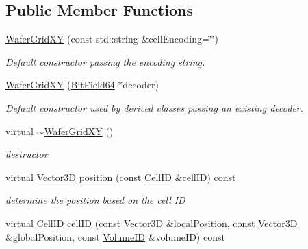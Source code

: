 \subsection*{Public Member Functions}
\begin{DoxyCompactItemize}
\item 
\hyperlink{class_d_d4hep_1_1_d_d_segmentation_1_1_wafer_grid_x_y_af8bf027d4db4e41a774451c0479e0e58}{WaferGridXY} (const std::string \&cellEncoding=\char`\"{}\char`\"{})
\begin{DoxyCompactList}\small\item\em Default constructor passing the encoding string. \item\end{DoxyCompactList}\item 
\hyperlink{class_d_d4hep_1_1_d_d_segmentation_1_1_wafer_grid_x_y_ad592caf7fc7f3b68248e3e81e653c773}{WaferGridXY} (\hyperlink{class_d_d4hep_1_1_d_d_segmentation_1_1_bit_field64}{BitField64} $\ast$decoder)
\begin{DoxyCompactList}\small\item\em Default constructor used by derived classes passing an existing decoder. \item\end{DoxyCompactList}\item 
virtual \hyperlink{class_d_d4hep_1_1_d_d_segmentation_1_1_wafer_grid_x_y_a07377755b469f13a9fea18473a39959e}{$\sim$WaferGridXY} ()
\begin{DoxyCompactList}\small\item\em destructor \item\end{DoxyCompactList}\item 
virtual \hyperlink{struct_d_d4hep_1_1_d_d_segmentation_1_1_vector3_d}{Vector3D} \hyperlink{class_d_d4hep_1_1_d_d_segmentation_1_1_wafer_grid_x_y_a1f72c4a0bc0cfbabe6395612518a4d34}{position} (const \hyperlink{namespace_d_d4hep_1_1_d_d_segmentation_ac7af071d85cb48820914434a07e21ba1}{CellID} \&cellID) const 
\begin{DoxyCompactList}\small\item\em determine the position based on the cell ID \item\end{DoxyCompactList}\item 
virtual \hyperlink{namespace_d_d4hep_1_1_d_d_segmentation_ac7af071d85cb48820914434a07e21ba1}{CellID} \hyperlink{class_d_d4hep_1_1_d_d_segmentation_1_1_wafer_grid_x_y_a9212a3077b9a25425612aa52d121bac9}{cellID} (const \hyperlink{struct_d_d4hep_1_1_d_d_segmentation_1_1_vector3_d}{Vector3D} \&localPosition, const \hyperlink{struct_d_d4hep_1_1_d_d_segmentation_1_1_vector3_d}{Vector3D} \&globalPosition, const \hyperlink{namespace_d_d4hep_1_1_d_d_segmentation_a61a6833a18d1800bdef176595f83e3ba}{VolumeID} \&volumeID) const 

\end{DoxyCompactItemize}
